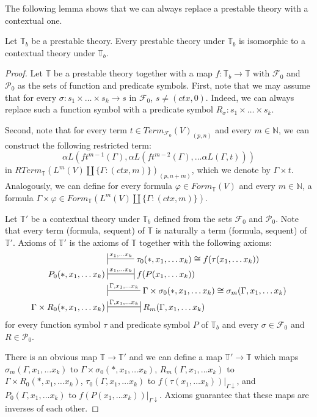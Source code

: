 \documentclass[reqno]{amsart}
\theoremstyle{definition}
\theoremstyle{remark}
\newcommand{\emptyCtx}{*}
\numberwithin{figure}{section}
\begin{document}
The following lemma shows that we can always replace a prestable theory with a contextual one.

\begin{lem}
Let $\mathbb{T}_b$ be a prestable theory.
Every prestable theory under $\mathbb{T}_b$ is isomorphic to a contextual theory under $\mathbb{T}_b$.
\end{lem}
\begin{proof}
Let $\mathbb{T}$ be a prestable theory together with a map $f : \mathbb{T}_b \to \mathbb{T}$ with $\mathcal{F}_0$ and $\mathcal{P}_0$ as the sets of function and predicate symbols.
First, note that we may assume that for every $\sigma : s_1 \times \ldots \times s_k \to s$ in $\mathcal{F}_0$, $s \neq (ctx,0)$.
Indeed, we can always replace such a function symbol with a predicate symbol $R_\sigma : s_1 \times \ldots \times s_k$.

Second, note that for every term $t \in Term_{\mathcal{F}_0}(V)_{(p,n)}$ and every $m \in \mathbb{N}$, we can construct the following restricted term:
\[ \alpha L(ft^{m-1}(\Gamma), \alpha L(ft^{m-2}(\Gamma), \ldots \alpha L(\Gamma, t))) \]
in $RTerm_{\mathbb{T}}(L^m(V) \amalg \{ \Gamma : (ctx,m) \})_{(p,n+m)}$, which we denote by $\Gamma \times t$.
Analogously, we can define for every formula $\varphi \in Form_{\mathbb{T}}(V)$ and every $m \in \mathbb{N}$,
a formula $\Gamma \times \varphi \in Form_{\mathbb{T}}(L^m(V) \amalg \{ \Gamma : (ctx,m) \})$.

Let $\mathbb{T}'$ be a contextual theory under $\mathbb{T}_b$ defined from the sets $\mathcal{F}_0$ and $\mathcal{P}_0$.
Note that every term (formula, sequent) of $\mathbb{T}$ is naturally a term (formula, sequent) of $\mathbb{T}'$.
Axioms of $\mathbb{T}'$ is the axioms of $\mathbb{T}$ together with the following axioms:
\begin{align*}
& \sststile{}{x_1, \ldots x_k} \tau_0(\emptyCtx, x_1, \ldots x_k) \cong f(\tau(x_1, \ldots x_k)) \\
P_0(\emptyCtx, x_1, \ldots x_k) & \ssststile{}{x_1, \ldots x_k} f(P(x_1, \ldots x_k)) \\
& \sststile{}{\Gamma, x_1, \ldots x_k} \Gamma \times \sigma_0(\emptyCtx, x_1, \ldots x_k) \cong \sigma_m(\Gamma, x_1, \ldots x_k) \\
\Gamma \times R_0(\emptyCtx, x_1, \ldots x_k) & \ssststile{}{\Gamma, x_1, \ldots x_k} R_m(\Gamma, x_1, \ldots x_k)
\end{align*}
for every function symbol $\tau$ and predicate symbol $P$ of $\mathbb{T}_b$ and every $\sigma \in \mathcal{F}_0$ and $R \in \mathcal{P}_0$.

There is an obvious map $\mathbb{T} \to \mathbb{T}'$ and we can define a map $\mathbb{T}' \to \mathbb{T}$
which maps $\sigma_m(\Gamma, x_1, \ldots x_k)$ to $\Gamma \times \sigma_0(\emptyCtx, x_1, \ldots x_k)$,
$R_m(\Gamma, x_1, \ldots x_k)$ to $\Gamma \times R_0(\emptyCtx, x_1, \ldots x_k)$,
$\tau_0(\Gamma, x_1, \ldots x_k)$ to $f(\tau(x_1, \ldots x_k))|_{\Gamma\downarrow}$, and $P_0(\Gamma, x_1, \ldots x_k)$ to $f(P(x_1, \ldots x_k))|_{\Gamma\downarrow}$.
Axioms guarantee that these maps are inverses of each other.
\end{proof}
\end{document}
